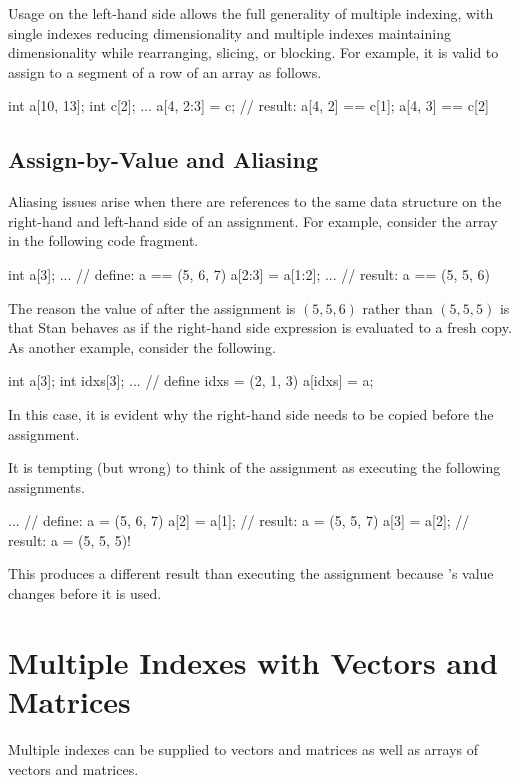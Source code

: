 Usage on the left-hand side allows the full generality of multiple
indexing, with single indexes reducing dimensionality and multiple
indexes maintaining dimensionality while rearranging, slicing, or
blocking.  For example, it is valid to assign to a segment of a row of
an array as follows.
%
\begin{stancode}
int a[10, 13];
int c[2];
...
a[4, 2:3] = c;  // result:  a[4, 2] == c[1];  a[4, 3] == c[2]
\end{stancode}

\subsection{Assign-by-Value and Aliasing}

Aliasing issues arise when there are references to the same data
structure on the right-hand and left-hand side of an assignment.  For
example, consider the array  in the following code fragment.
%
\begin{stancode}
int a[3];
...                // define: a == (5, 6, 7)
a[2:3] = a[1:2];
...                // result: a == (5, 5, 6)
\end{stancode}
%
The reason the value of  after the assignment is $(5,5,6)$
rather than $(5,5,5)$ is that Stan behaves as if the right-hand side
expression is evaluated to a fresh copy.   As another example,
consider the following.
%
\begin{stancode}
int a[3];
int idxs[3];
...            // define idxs = (2, 1, 3)
a[idxs] = a;
\end{stancode}
%
In this case, it is evident why the right-hand side needs to be copied
before the assignment.

It is tempting (but wrong) to think of the assignment  as executing the following assignments.
%
\begin{stancode}
...                // define: a = (5, 6, 7)
a[2] = a[1];      // result: a = (5, 5, 7)
a[3] = a[2];      // result: a = (5, 5, 5)!
\end{stancode}
%
This produces a different result than executing the assignment because
's value changes before it is used.


\section{Multiple Indexes with Vectors and Matrices}

Multiple indexes can be supplied to vectors and matrices as well as
arrays of vectors and matrices.

